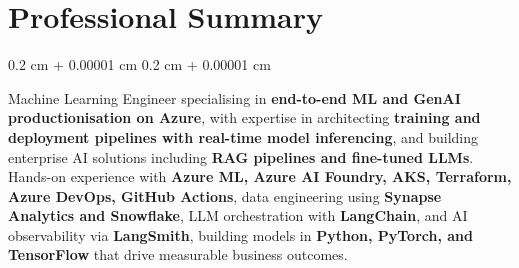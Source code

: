 \documentclass[10pt, letterpaper]{article}
\newenvironment{onecolentry}{
    \begin{adjustwidth}{
        0.2 cm + 0.00001 cm
    }{
        0.2 cm + 0.00001 cm
    }
}{
    \end{adjustwidth}
} %
\begin{document}
\section{Professional Summary}
\begin{onecolentry}
    Machine Learning Engineer specialising in \textbf{end-to-end ML and GenAI productionisation on Azure}, with expertise in architecting \textbf{training and deployment pipelines with real-time model inferencing}, and building enterprise AI solutions including \textbf{RAG pipelines and fine-tuned LLMs}. Hands-on experience with \textbf{Azure ML, Azure AI Foundry, AKS, Terraform, Azure DevOps, GitHub Actions}, data engineering using \textbf{Synapse Analytics and Snowflake}, LLM orchestration with \textbf{LangChain}, and AI observability via \textbf{LangSmith}, building models in \textbf{Python, PyTorch, and TensorFlow} that drive measurable business outcomes.
\end{onecolentry}
\end{document}
